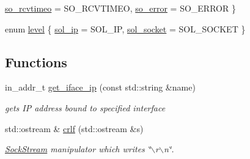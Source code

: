 \begin{CompactItemize}
\par
\hyperlink{namespacesocketpp_ea335944de1f6b81489c90507884cfc4ecd98d0c015681e55d1877cf27011440}{so\_\-rcvtimeo} =  SO\_\-RCVTIMEO, 
\hyperlink{namespacesocketpp_ea335944de1f6b81489c90507884cfc4896e502dbf03b162df4949bc5326dbf3}{so\_\-error} =  SO\_\-ERROR
 \}
\item 
enum \hyperlink{namespacesocketpp_4dbb83d08769b55fc6e283b73ae11bb5}{level} \{ \hyperlink{namespacesocketpp_4dbb83d08769b55fc6e283b73ae11bb5d7ddf065e140601e3ad93d72e6c787ab}{sol\_\-ip} =  SOL\_\-IP, 
\hyperlink{namespacesocketpp_4dbb83d08769b55fc6e283b73ae11bb568097d5b8690a9619c42192ee5da5252}{sol\_\-socket} =  SOL\_\-SOCKET
 \}
\end{CompactItemize}
\subsection*{Functions}
\begin{CompactItemize}
\item 
in\_\-addr\_\-t \hyperlink{namespacesocketpp_e04237b3f443ecc14051f52a59450692}{get\_\-iface\_\-ip} (const std::string \&name)
\begin{CompactList}\small\item\em gets IP address bound to specified interface \item\end{CompactList}\item 
std::ostream \& \hyperlink{namespacesocketpp_0c17a8fc8340bca21992d92cf17f8df5}{crlf} (std::ostream \&s)
\begin{CompactList}\small\item\em \hyperlink{classsocketpp_1_1SockStream}{SockStream} manipulator which writes \char`\"{}$\backslash$r$\backslash$n\char`\"{}. \item\end{CompactList}\end{CompactItemize}
